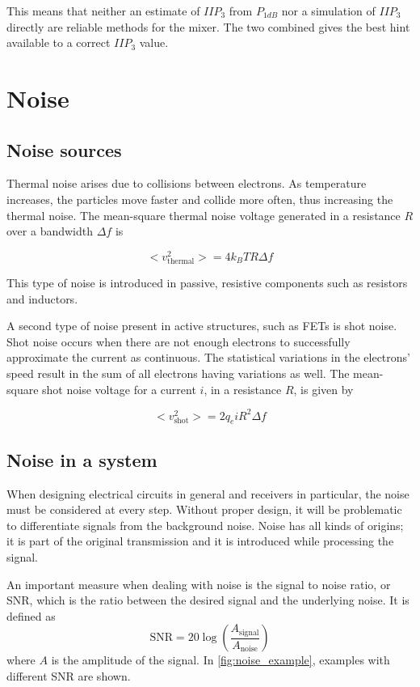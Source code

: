 			This means that neither an estimate of $IIP_3$ from $P_{1dB}$ nor a simulation of $IIP_3$ directly are reliable methods for the mixer. The two combined gives the best hint available to a correct $IIP_3$ value.

	\section{Noise}
		\subsection{Noise sources}\label{sec:noise_thermal}
			Thermal noise arises due to collisions between electrons. As temperature increases, the particles move faster and collide more often, thus increasing the thermal noise. The mean-square thermal noise voltage generated in a resistance $R$ over a bandwidth $\Delta f$ is \autocite{bahl03}

			\begin{equation}
				< v^2_\text{thermal} > = 4k_BTR\Delta f
			\end{equation}

			This type of noise is introduced in passive, resistive components such as resistors and inductors.

			A second type of noise present in active structures, such as FETs is shot noise. Shot noise occurs when there are not enough electrons to successfully approximate the current as continuous. The statistical variations in the electrons' speed result in the sum of all electrons having variations as well. The mean-square shot noise voltage for a current $i$, in a resistance $R$, is given by

			\begin{equation}
				< v^2_\text{shot} > = 2q_eiR^2\Delta f
			\end{equation}

		\subsection{Noise in a system}
			When designing electrical circuits in general and receivers in particular, the noise must be considered at every step. Without proper design, it will be problematic to differentiate signals from the background noise. Noise has all kinds of origins; it is part of the original transmission and it is introduced while processing the signal.

			An important measure when dealing with noise is the signal to noise ratio, or SNR, which is the ratio between the desired signal and the underlying noise. It is defined as
			\begin{equation}\label{sec:eq:cascnoise}
					\text{SNR}=20\log \left(\frac{ A_\text{signal} }{ A_\text{noise} }\right)
			\end{equation}
			where $A$ is the amplitude of the signal. In \autoref{fig:noise_example}, examples with different SNR are shown.

